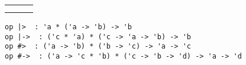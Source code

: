 \begin{isabellebody}
\begin{isamarkuptext}
  \medskip
  \begin{tabular}{lll}
  \isa{{\isaliteral{28}{\isacharparenleft}}x{\isaliteral{2C}{\isacharcomma}}\ y{\isaliteral{29}{\isacharparenright}}\ {\isaliteral{7C}{\isacharbar}}{\isaliteral{2D}{\isacharminus}}{\isaliteral{3E}{\isachargreater}}\ f} & \isa{{\isaliteral{5C3C65717569763E}{\isasymequiv}}} & \isa{f\ x\ y} \\
  \isa{f\ {\isaliteral{23}{\isacharhash}}{\isaliteral{2D}{\isacharminus}}{\isaliteral{3E}{\isachargreater}}\ g} & \isa{{\isaliteral{5C3C65717569763E}{\isasymequiv}}} & \isa{x\ {\isaliteral{7C}{\isacharbar}}{\isaliteral{3E}{\isachargreater}}\ f\ {\isaliteral{7C}{\isacharbar}}{\isaliteral{2D}{\isacharminus}}{\isaliteral{3E}{\isachargreater}}\ g} \\
  \end{tabular}
  \medskip%
\end{isamarkuptext}%
\isamarkuptrue%
%
\isadelimmlref
%
\endisadelimmlref
%
\isatagmlref
%
\begin{isamarkuptext}%
\begin{mldecls}
  \verb|op |\verb,|,\verb|>  : 'a * ('a -> 'b) -> 'b| \\
  \verb|op |\verb,|,\verb|->  : ('c * 'a) * ('c -> 'a -> 'b) -> 'b| \\
  \verb|op #>  : ('a -> 'b) * ('b -> 'c) -> 'a -> 'c| \\
  \verb|op #->  : ('a -> 'c * 'b) * ('c -> 'b -> 'd) -> 'a -> 'd| \\
  \end{mldecls}


\end{isamarkuptext}
\end{isabellebody}
